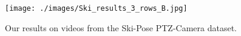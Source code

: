 \begin{figure}[tb]
\centering
\texttt{[image: ./images/Ski\_results\_3\_rows\_B.jpg]}
\vspace{-20pt}
\caption{Our results on videos from the Ski-Pose PTZ-Camera dataset.} 
\label{fig:ski_ptz_qualitative}
\vspace{-10pt}
\end{figure}

